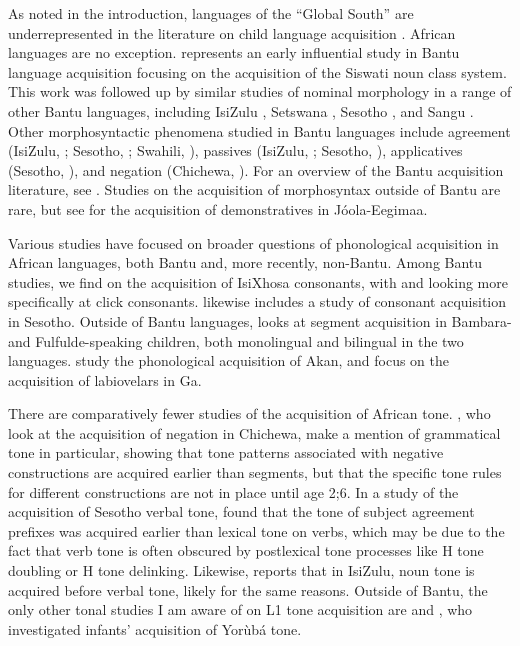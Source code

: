 \documentclass[output=paper,colorlinks,citecolor=brown,
]{langscibook}
\begin{document}
As noted in the introduction, languages of the ``Global South'' are underrepresented in the literature on child language acquisition \citep{Kellyetal15, KiddGarcia22}. African languages are no exception. \citet{Kunene79} represents an early influential study in Bantu language acquisition focusing on the acquisition of the Siswati noun class system. This work was followed up by similar studies of nominal morphology in a range of other Bantu languages, including IsiZulu \citep{Suzman91}, Setswana \citep{Tsonope87}, Sesotho \citep{Connelly84, Demuth88, Demuth00}, and Sangu \citep{Idiata98}. Other morphosyntactic phenomena studied in Bantu languages include agreement (IsiZulu, \citealt{Suzman82}; Sesotho, \citealt{Demuth88, Demuth00, Demuthetal09}; Swahili, \citealt{Deen05}), passives (IsiZulu, \citealt{Suzman85, Suzman87}; Sesotho, \citealt{Demuth89, Demuth90, Demuthetal10, Crawford12}), applicatives (Sesotho, \citealt{Demuthetal05}), and negation (Chichewa, \citealt{Chimombo81}). For an overview of the Bantu acquisition literature, see \citet{Demuth03}. Studies on the acquisition of morphosyntax outside of Bantu are rare, but see \citet{Sagnaetal22} for the acquisition of demonstratives in Jóola-Eegimaa. 

Various studies have focused on broader questions of phonological acquisition in African languages, both Bantu and, more recently, non-Bantu. Among Bantu studies, we find \citet{MowrerBurger91} on the acquisition of IsiXhosa consonants, with \citet{Lewis94} and \citet{LewisRoux96} looking more specifically at click consonants. \citet{Demuth92} likewise includes a study of consonant acquisition in Sesotho. Outside of Bantu languages, \citet{Cisse14} looks at segment acquisition in Bambara- and Fulfulde-speaking children, both monolingual and bilingual in the two languages. \citet{Amoakaetal20} study the phonological acquisition of Akan, and \citet{Kpogoetal21} focus on the acquisition of labiovelars in Ga. 

There are comparatively fewer studies of the acquisition of African tone. \citet{ChimomboMtenje89}, who look at the acquisition of negation in Chichewa, make a mention of grammatical tone in particular, showing that tone patterns associated with negative constructions are acquired earlier than segments, but that the specific tone rules for different constructions are not in place until age 2;6. In a study of the acquisition of Sesotho verbal tone, \citet{Demuth89, Demuth93} found that the tone of subject agreement prefixes was acquired earlier than lexical tone on verbs, which may be due to the fact that verb tone is often obscured by postlexical tone processes like H tone doubling or H tone delinking. Likewise, \citet{Suzman91} reports that in IsiZulu, noun tone is acquired before verbal tone, likely for the same reasons. Outside of Bantu, the only other tonal studies I am aware of on L1 tone acquisition are \citet{Bakare95} and \citet{Harrison00}, who investigated infants' acquisition of Yorùbá tone. 
\end{document}
